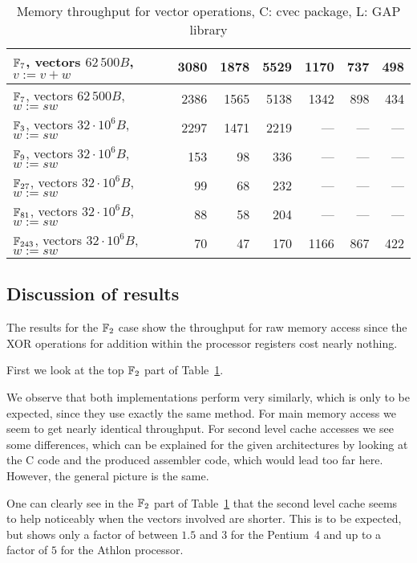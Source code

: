 \begin{table}[ht]
\begin{center}
\begin{tabular}{|l|r|r|r|r|r|r|}
\hline
$\mathbb{F}_7$, vectors $62\,500 B$, $v := v+w$      
& 3080 & 1878 & 5529 & 1170 & 737 & 498 \\
\hline                                                    
$\mathbb{F}_7$, vectors $62\,500 B$, $w := sw$       
& 2386 & 1565 & 5138 & 1342 & 898 & 434 \\
\hline
\hline
$\mathbb{F}_3$, vectors $32\cdot 10^6 B$, $w := sw$
& 2297 & 1471 & 2219 & --- & --- & --- \\
\hline
$\mathbb{F}_9$, vectors $32\cdot 10^6 B$, $w := sw$
& 153 & 98 & 336 & --- & --- & --- \\
\hline
$\mathbb{F}_{27}$, vectors $32\cdot 10^6 B$, $w := sw$
& 99 & 68 & 232 & --- & --- & --- \\
\hline
$\mathbb{F}_{81}$, vectors $32\cdot 10^6 B$, $w := sw$
& 88 & 58 & 204 & --- & --- & --- \\
\hline
$\mathbb{F}_{243}$, vectors $32\cdot 10^6 B$, $w := sw$
& 70 & 47 & 170 & 1166 & 867 & 422 \\
\hline
\end{tabular}
\end{center}
\caption{Memory throughput for vector operations, C: {\sf cvec} package, 
L: {\sf GAP} library}
\label{memthrough}
\end{table}

\subsection{Discussion of results}
\label{ssec:discussion}

The results for the $\mathbb{F}_2$ case show the throughput for raw memory access
since the XOR operations for addition within the processor registers cost
nearly nothing. 

First we look at the top $\mathbb{F}_2$ part of Table~\ref{memthrough}.

We observe that both implementations perform very similarly, which is
only to be expected, since they use exactly the same method. For
main memory access we seem to get nearly identical throughput. For 
second level cache accesses we see some differences, which can be
explained for the given architectures by looking at the C code and the
produced assembler code, which would lead too far here. However, 
the general picture is the same.

One can clearly see in the $\mathbb{F}_2$ part of
Table~\ref{memthrough} that the second level cache seems to help noticeably
when the vectors involved are shorter. This is to be expected, but shows
only a factor of between $1.5$ and $3$ for the Pentium~4 and up to 
a factor of $5$ for the Athlon processor.

